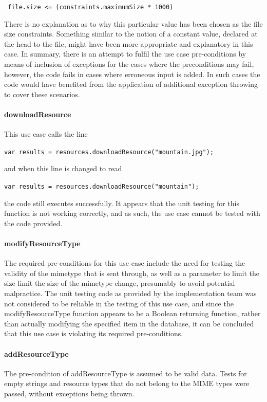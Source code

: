 \documentclass[a4paper]{article}
\begin{document}
\texttt{	file.size <= (constraints.maximumSize * 1000)}

There is no explanation as to why this particular value has been chosen as the file size constraints. Something similar to the notion of a constant value, declared at the head to the file, might have been more appropriate and explanatory in this case.
In summary, there is an attempt to fulfil the use case pre-conditions by means of inclusion of exceptions for the cases where the preconditions may fail, however, the code fails in cases where erroneous input is added. In such cases the code would have benefited from the application of additional exception throwing to cover these scenarios.

\paragraph{downloadResource} 

This use case calls the line 

\texttt{var results = resources.downloadResource("mountain.jpg");}

and when this line is changed to read

\texttt{var results = resources.downloadResource("mountain");}

the code still executes successfully. It appears that the unit testing for this function is not working correctly, and as such, the use case cannot be tested with the code provided. 

\paragraph{modifyResourceType}
The required pre-conditions for this use case include the need for testing the validity of the mimetype that is sent through, as well as a parameter to limit the size limit the size of the mimetype change, presumably to avoid potential malpractice. The unit testing code as provided by the implementation team was not considered to be reliable in the testing of this use case, and since the modifyResourceType function appears to be a Boolean returning function, rather than actually modifying the specified item in the database, it can be concluded that this use case is violating its required pre-conditions.

\paragraph{addResourceType}
The pre-condition of addResourceType is assumed to be valid data. Tests for empty strings and resource types that do not belong to the MIME types were passed, without exceptions being thrown.
\end{document}
